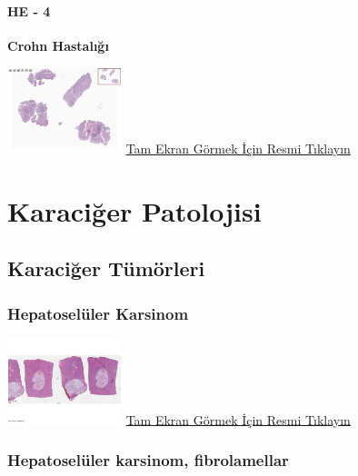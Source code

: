 \documentclass[
  letterpaper,
  DIV=11,
  numbers=noendperiod]{scrreprt}
\begin{document}
\hypertarget{he---4}{%
\subsection{HE - 4}\label{he---4}}

\textbf{Crohn Hastalığı}

\href{https://images.patolojiatlasi.com/crohn-colonoscopic-biopsy/HE4.html}{\includegraphics[width=0.25\textwidth,height=\textheight]{./screenshots/crohn-colonoscopic-biopsy-HE4_screenshot.png}}
\href{https://images.patolojiatlasi.com/crohn-colonoscopic-biopsy/HE4.html}{Tam
Ekran Görmek İçin Resmi Tıklayın}

\part{Karaciğer Patolojisi}

\hypertarget{sec-karaciger-tumorleri}{%
\chapter{Karaciğer Tümörleri}\label{sec-karaciger-tumorleri}}

\hypertarget{sec-hepatoseluler-karsinom}{%
\section{Hepatoselüler Karsinom}\label{sec-hepatoseluler-karsinom}}

\href{https://images.patolojiatlasi.com/hepatocellularcarcinoma/HCC/viewer_z0.html}{\includegraphics[width=0.25\textwidth,height=\textheight]{./screenshots/hepatocellularcarcinoma_screenshot.png}}
\href{https://images.patolojiatlasi.com/hepatocellularcarcinoma/HCC/viewer_z0.html}{Tam
Ekran Görmek İçin Resmi Tıklayın}

\hypertarget{sec-hepatoseluler-karsinom-fibrolamellar}{%
\section{Hepatoselüler karsinom,
fibrolamellar}\label{sec-hepatoseluler-karsinom-fibrolamellar}}
\end{document}
